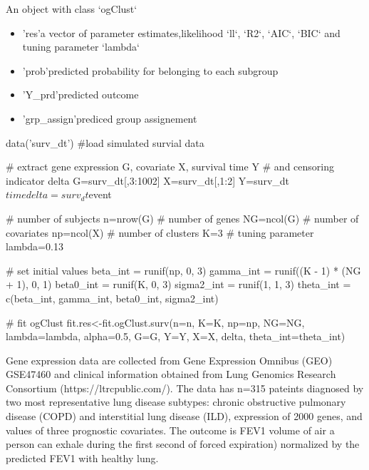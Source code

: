 \documentclass[a4paper]{book}
\begin{document}
%
\begin{Value}
An object with class `ogClust`
\begin{itemize}

\item{} 'res'a vector of parameter estimates,likelihood `ll`, `R2`, `AIC`, `BIC` and tuning parameter `lambda`
\item{} 'prob'predicted probability for belonging to each subgroup
\item{} 'Y\_prd'predicted outcome
\item{} 'grp\_assign'prediced group assignement

\end{itemize}

\end{Value}
%
\begin{Examples}
\begin{ExampleCode}
  data('surv_dt') #load simulated survial data

  # extract gene expression G, covariate X, survival time Y
  # and censoring indicator delta
  G=surv_dt[,3:1002]
  X=surv_dt[,1:2]
  Y=surv_dt$time
  delta=surv_dt$event

  # number of subjects
  n=nrow(G)
  # number of genes
  NG=ncol(G)
  # number of covariates
  np=ncol(X)
  # number of clusters
  K=3
  # tuning parameter
  lambda=0.13

  # set initial values
  beta_int = runif(np, 0, 3)
  gamma_int = runif((K - 1) * (NG + 1), 0, 1)
  beta0_int = runif(K, 0, 3)
  sigma2_int = runif(1, 1, 3)
  theta_int = c(beta_int, gamma_int, beta0_int, sigma2_int)

  # fit ogClust
  fit.res<-fit.ogClust.surv(n=n, K=K, np=np, NG=NG, lambda=lambda,
                         alpha=0.5, G=G, Y=Y, X=X, delta, theta_int=theta_int)
\end{ExampleCode}
\end{Examples}
%
\begin{Description}\relax
Gene expression data are collected from Gene Expression Omnibus (GEO) GSE47460
and clinical information obtained from Lung Genomics Research Consortium
(https://ltrcpublic.com/). The data has n=315 pateints diagnosed by
two most representative lung disease subtypes: chronic obstructive pulmonary disease (COPD)
and interstitial lung disease (ILD), expression of 2000 genes, and values of
three prognostic covariates.
The outcome is FEV1
volume of air a person can exhale during the first second of
forced expiration) normalized by the predicted FEV1 with healthy lung.
\end{Description}
\end{document}
